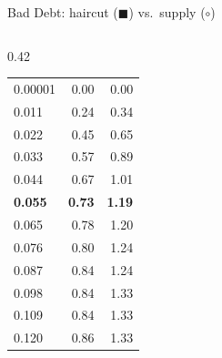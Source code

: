 \documentclass[aspectratio=169,10pt]{beamer}
\begin{document}
\begin{frame}{Bad Debt: haircut ($\blacksquare$) vs.\ supply ($\circ$)}
\begin{columns}[T]
\begin{column}{0.42\textwidth}
\begin{tabular}{lrr}
        \midrule
        0.00001 & 0.00 & 0.00 \\
        0.011 & 0.24 & 0.34 \\
        0.022 & 0.45 & 0.65 \\
        0.033 & 0.57 & 0.89 \\
        0.044 & 0.67 & 1.01 \\
        \textbf{0.055} & \textbf{0.73} & \textbf{1.19} \\
        0.065 & 0.78 & 1.20 \\
        0.076 & 0.80 & 1.24 \\
        0.087 & 0.84 & 1.24 \\
        0.098 & 0.84 & 1.33 \\
        0.109 & 0.84 & 1.33 \\
        0.120 & 0.86 & 1.33 \\
        \bottomrule
      \end{tabular}
    \end{column}
  \end{columns}
\end{frame}
\end{document}

